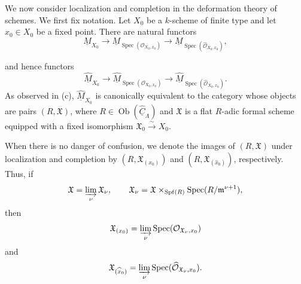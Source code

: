 
We now consider localization and completion in the deformation theory
of schemes. We first fix notation. Let $X_0$ be a $k$-scheme of finite
type and let $x_0\in X_0$ be a fixed point. There are natural functors
\[
\underline M_{X_0}
\longrightarrow
\underline M_{\operatorname{Spec}(\mathcal O_{X_0,x_0})}
\longrightarrow
\underline M_{\operatorname{Spec}(\widehat{\mathcal O}_{X_0,x_0})},
\]


and hence functors
\[
\widehat{\underline M}_{X_0}
\longrightarrow
\widehat{\underline M}_{\operatorname{Spec}(\mathcal O_{X_0,x_0})}
\longrightarrow
\widehat{\underline M}_{\operatorname{Spec}
 (\widehat{\mathcal O}_{X_0,x_0})}.
\]
As observed in (c), $\widehat{\underline M}_{X_0}$ is canonically
equivalent to the category whose objects are pairs $(R,\mathfrak X)$,
where $R\in\operatorname{Ob}(\widehat{\underline C}_\Lambda)$ and
$\mathfrak X$ is a flat $R$-adic formal scheme equipped with a fixed
isomorphism $\mathfrak X_0\xrightarrow{\sim}X_0$.

When there is no danger of confusion, we denote the images of
$(R,\mathfrak X)$ under localization and completion by
$(R,\mathfrak X_{(x_0)})$ and
$(R,\mathfrak X_{(\widehat{x}_0)})$, respectively. Thus, if
\[
\mathfrak X=\varinjlim_\nu\mathfrak X_\nu,
\qquad
\mathfrak X_\nu
=\mathfrak X\times_{\operatorname{Spf}(R)}
 \operatorname{Spec}(R/\mathfrak m^{\nu+1}),
\]
then
\[
\mathfrak X_{(x_0)}
=\varinjlim_\nu
 \operatorname{Spec}(\mathcal O_{\mathfrak X_\nu,x_0})
\]
and
\[
\mathfrak X_{(\widehat{x}_0)}
=\varinjlim_\nu
 \operatorname{Spec}(\widehat{\mathcal O}_{\mathfrak X_\nu,x_0}).
\]
